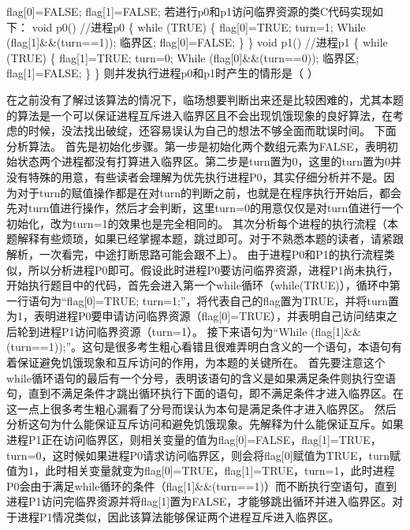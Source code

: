 flag{[}0{]}=FALSE; flag{[}1{]}=FALSE;
若进行p0和p1访问临界资源的类C代码实现如下： void p0() //进程p0 \{ while
(TRUE) \{ flag{[}0{]}=TRUE; turn=1; While (flag{[}1{]}\&\&(turn==1));
临界区; flag{[}0{]}=FALSE; \} \} void p1() //进程p1 \{ while (TRUE) \{
flag{[}1{]}=TRUE; turn=0; While (flag{[}0{]}\&\&(turn==0)); 临界区;
flag{[}1{]}=FALSE; \} \} 则并发执行进程p0和p1时产生的情形是（ ）
\par{}
\begin{solution}在之前没有了解过该算法的情况下，临场想要判断出来还是比较困难的，尤其本题的算法是一个可以保证进程互斥进入临界区且不会出现饥饿现象的良好算法，在考虑的时候，没法找出破绽，还容易误认为自己的想法不够全面而耽误时间。
下面分析算法。
首先是初始化步骤。第一步是初始化两个数组元素为FALSE，表明初始状态两个进程都没有打算进入临界区。第二步是turn置为0，这里的turn置为0并没有特殊的用意，有些读者会理解为优先执行进程P0，其实仔细分析并不是。因为对于turn的赋值操作都是在对turn的判断之前，也就是在程序执行开始后，都会先对turn值进行操作，然后才会判断，这里turn=0的用意仅仅是对turn值进行一个初始化，改为turn=1的效果也是完全相同的。
其次分析每个进程的执行流程（本题解释有些烦琐，如果已经掌握本题，跳过即可。对于不熟悉本题的读者，请紧跟解析，一次看完，中途打断思路可能会跟不上）。
由于进程P0和P1的执行流程类似，所以分析进程P0即可。假设此时进程P0要访问临界资源，进程P1尚未执行，开始执行题目中的代码，首先会进入第一个while循环（while(TRUE)），循环中第一行语句为``flag{[}0{]}=TRUE;
turn=1;''，将代表自己的flag置为TRUE，并将turn置为1，表明进程P0要申请访问临界资源（flag{[}0{]}=TRUE），并表明自己访问结束之后轮到进程P1访问临界资源（turn=1）。
接下来语句为``While
(flag{[}1{]}\&\&(turn==1));''。这句是很多考生粗心看错且很难弄明白含义的一个语句，本语句有着保证避免饥饿现象和互斥访问的作用，为本题的关键所在。
首先要注意这个while循环语句的最后有一个分号，表明该语句的含义是如果满足条件则执行空语句，直到不满足条件才跳出循环执行下面的语句，即不满足条件才进入临界区。在这一点上很多考生粗心漏看了分号而误认为本句是满足条件才进入临界区。
然后分析这句为什么能保证互斥访问和避免饥饿现象。先解释为什么能保证互斥。如果进程P1正在访问临界区，则相关变量的值为flag{[}0{]}=FALSE，flag{[}1{]}=TRUE，turn=0，这时候如果进程P0请求访问临界区，则会将flag{[}0{]}赋值为TRUE，turn赋值为1，此时相关变量就变为flag{[}0{]}=TRUE，flag{[}1{]}=TRUE，turn=1，此时进程P0会由于满足while循环的条件（flag{[}1{]}\&\&(turn==1)）而不断执行空语句，直到进程P1访问完临界资源并将flag{[}1{]}置为FALSE，才能够跳出循环并进入临界区。对于进程P1情况类似，因此该算法能够保证两个进程互斥进入临界区。

\end{solution}
